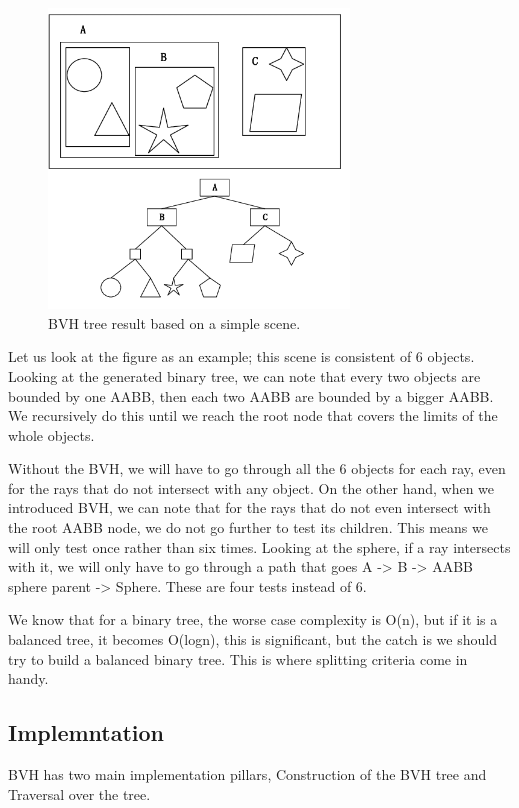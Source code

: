 \documentclass[11pt,a4paper]{article}
\begin{document}
\begin{figure}[h]	
     \centering
         \includegraphics[width=8cm]{images/bvh_tree.png}
        \caption{BVH tree result based on a simple scene. \protect\cite{Ericson2004} }
        \label{fig:dice}
\end{figure}


Let us look at the figure as an example; this scene is consistent of 6 objects. Looking at the generated binary tree, we can note that every two objects are bounded by one AABB, then each two AABB are bounded by a bigger AABB. We recursively do this until we reach the root node that covers the limits of the whole objects. 

Without the BVH, we will have to go through all the 6 objects for each ray, even for the rays that do not intersect with any object. On the other hand, when we introduced BVH, we can note that for the rays that do not even intersect with the root AABB node, we do not go further to test its children. This means we will only test once rather than six times. Looking at the sphere, if a ray intersects with it, we will only have to go through a path that goes A -> B -> AABB sphere parent -> Sphere. These are four tests instead of 6. 

We know that for a binary tree, the worse case complexity is O(n), but if it is a balanced tree, it becomes O(logn), this is significant, but the catch is we should try to build a balanced binary tree. This is where splitting criteria come in handy. 


\subsection{Implemntation}
BVH has two main implementation pillars, Construction of the BVH tree and Traversal over the tree.  
\end{document}
